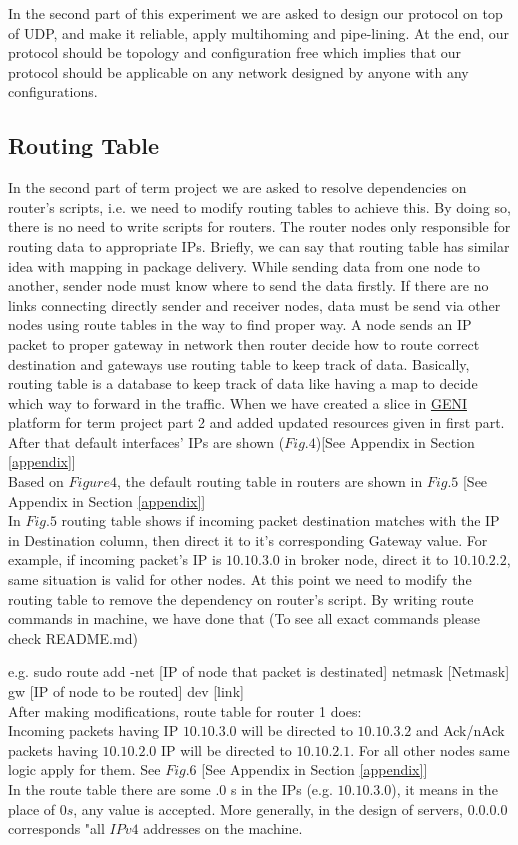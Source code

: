 In the second part of this experiment we are asked to design our protocol on top of UDP, and make it reliable, apply multihoming and pipe-lining. At the end, our protocol should be topology and configuration free which implies that our protocol should be applicable on any network designed by anyone with any configurations.
\subsection{Routing Table}
In the second part of term project we are asked to resolve dependencies on router's scripts, i.e. we need to modify routing tables to achieve this. By doing so, there is no need to write scripts for routers. The router nodes only responsible for routing data to appropriate IPs. Briefly, we can say that routing table has similar idea with mapping in package delivery. While sending data from one node to another, sender node must know where to send the data firstly. If there are no links connecting directly sender and receiver nodes, data must be send via other nodes using route tables in the way to find proper way. A node sends an IP packet to proper gateway in network then router decide how to route correct destination and gateways use routing table to keep track of data. Basically, routing table is a database to keep track of data like having a map to decide which way to forward in the traffic. When we have created a slice in \href{https://portal.geni.net}{GENI} platform for term project part 2 and added updated resources given in first part. After that default interfaces' IPs are shown ($Fig. 4$)[See Appendix in Section \ref{appendix}]\\
Based on $Figure 4$, the default routing table in routers are shown in $Fig. 5$ [See Appendix in Section \ref{appendix}]\\
In $Fig.5$ routing table shows if incoming packet destination matches with the IP in Destination column, then direct it to it's corresponding Gateway value. For example, if incoming packet's IP is $10.10.3.0$ in broker node, direct it to $10.10.2.2$, same situation is valid for other nodes. At this point we need to modify the routing table to remove the dependency on router's script. By writing route commands in machine, we have done that (To see all exact commands please check README.md)

e.g. sudo route add -net [IP of node that packet is destinated] netmask [Netmask] gw [IP of node to be routed] dev [link]\\
\newpage
After making modifications, route table for router 1 does:\\
Incoming packets having IP $10.10.3.0$ will be directed to $10.10.3.2$ and Ack/nAck packets having $10.10.2.0$ IP will be directed to $10.10.2.1$. For all other nodes same logic apply for them. See $Fig. 6$ [See Appendix in Section \ref{appendix}]\\
In the route table there are some $.0$ s in the IPs (e.g. $10.10.3.0$), it means in the place of $0s$, any value is accepted. More generally, in the design of servers, $0.0.0.0$ corresponds "all $IPv4$ addresses on the machine. 

